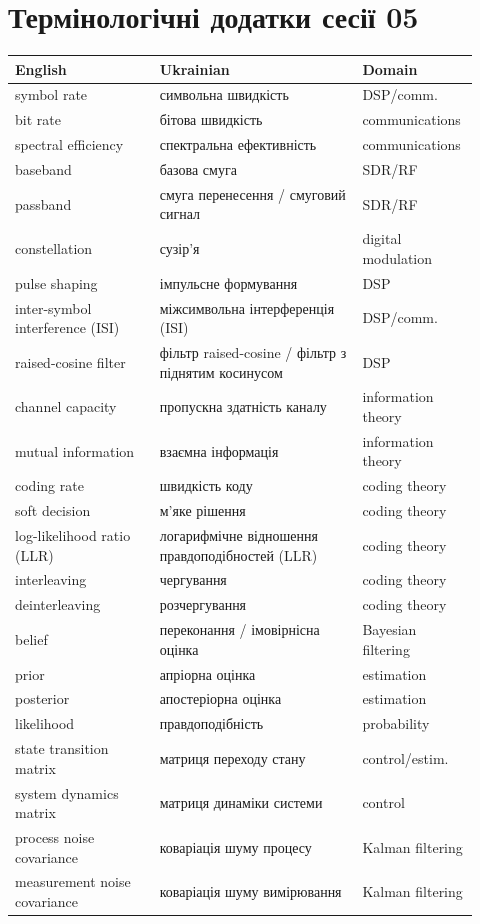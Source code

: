 \chapter{Термінологічні додатки сесії 05}
\label{app:terminology-session05}

\begin{longtable}{L{0.30\linewidth}L{0.42\linewidth}L{0.20\linewidth}}
\toprule
English & Ukrainian & Domain \\
\midrule
symbol rate & символьна швидкість & DSP/comm. \\
bit rate & бітова швидкість & communications \\
spectral efficiency & спектральна ефективність & communications \\
baseband & базова смуга & SDR/RF \\
passband & смуга перенесення / смуговий сигнал & SDR/RF \\
constellation & сузір'я & digital modulation \\
pulse shaping & імпульсне формування & DSP \\
inter-symbol interference (ISI) & міжсимвольна інтерференція (ISI) & DSP/comm. \\
raised-cosine filter & фільтр raised-cosine / фільтр з піднятим косинусом & DSP \\
channel capacity & пропускна здатність каналу & information theory \\
mutual information & взаємна інформація & information theory \\
coding rate & швидкість коду & coding theory \\
soft decision & м'яке рішення & coding theory \\
log-likelihood ratio (LLR) & логарифмічне відношення правдоподібностей (LLR) & coding theory \\
interleaving & чергування & coding theory \\
deinterleaving & розчергування & coding theory \\
belief & переконання / імовірнісна оцінка & Bayesian filtering \\
prior & апріорна оцінка & estimation \\
posterior & апостеріорна оцінка & estimation \\
likelihood & правдоподібність & probability \\
state transition matrix & матриця переходу стану & control/estim. \\
system dynamics matrix & матриця динаміки системи & control \\
process noise covariance & коваріація шуму процесу & Kalman filtering \\
measurement noise covariance & коваріація шуму вимірювання & Kalman filtering \\
\bottomrule
\end{longtable}
